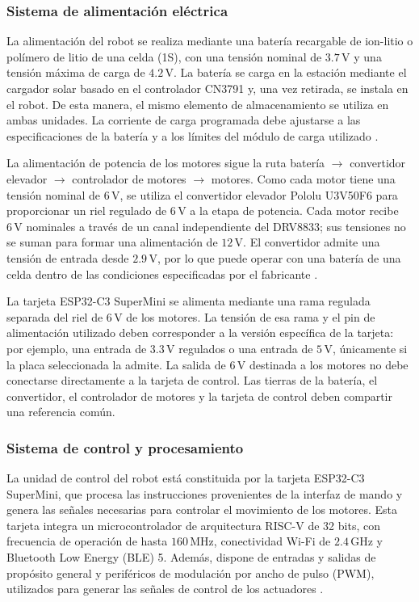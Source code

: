 \documentclass[11pt]{article}
\begin{document}
\subsubsection{Sistema de alimentación eléctrica}

La alimentación del robot se realiza mediante una batería recargable de ion-litio
o polímero de litio de una celda (1S), con una tensión nominal de
\(3.7\,\mathrm{V}\) y una tensión máxima de carga de \(4.2\,\mathrm{V}\). La
batería se carga en la estación mediante el cargador solar basado en el
controlador CN3791 y, una vez retirada, se instala en el robot. De esta manera,
el mismo elemento de almacenamiento se utiliza en ambas unidades. La corriente
de carga programada debe ajustarse a las especificaciones de la batería y a
los límites del módulo de carga utilizado
\cite{consonance_cn3791_datasheet}.

La alimentación de potencia de los motores sigue la ruta
batería \(\rightarrow\) convertidor elevador \(\rightarrow\) controlador de
motores \(\rightarrow\) motores. Como cada motor tiene una tensión nominal de
\(6\,\mathrm{V}\), se utiliza el convertidor elevador Pololu U3V50F6 para
proporcionar un riel regulado de \(6\,\mathrm{V}\) a la etapa de potencia. Cada
motor recibe \(6\,\mathrm{V}\) nominales a través de un canal independiente
del DRV8833; sus tensiones no se suman para formar una alimentación de
\(12\,\mathrm{V}\). El convertidor admite una tensión de entrada desde
\(2.9\,\mathrm{V}\), por lo que puede operar con una batería de una celda dentro
de las condiciones especificadas por el fabricante
\cite{pololu_u3v50f6}.

La tarjeta ESP32-C3 SuperMini se alimenta mediante una rama regulada separada
del riel de \(6\,\mathrm{V}\) de los motores. La tensión de esa rama y el pin
de alimentación utilizado deben corresponder a la versión específica de la
tarjeta: por ejemplo, una entrada de \(3.3\,\mathrm{V}\) regulados o una
entrada de \(5\,\mathrm{V}\), únicamente si la placa seleccionada la admite.
La salida de \(6\,\mathrm{V}\) destinada a los motores no debe conectarse
directamente a la tarjeta de control. Las tierras de la batería, el
convertidor, el controlador de motores y la tarjeta de control deben compartir
una referencia común.

\subsubsection{Sistema de control y procesamiento}

La unidad de control del robot está constituida por la tarjeta ESP32-C3
SuperMini, que procesa las instrucciones provenientes de la interfaz de mando
y genera las señales necesarias para controlar el movimiento de los motores.
Esta tarjeta integra un microcontrolador de arquitectura RISC-V de 32 bits,
con frecuencia de operación de hasta \(160\,\mathrm{MHz}\), conectividad Wi-Fi
de \(2.4\,\mathrm{GHz}\) y Bluetooth Low Energy (BLE) 5. Además, dispone de
entradas y salidas de propósito general y periféricos de modulación por ancho
de pulso (PWM), utilizados para generar las señales de control de los
actuadores \cite{espressif_esp32c3}.
\end{document}

